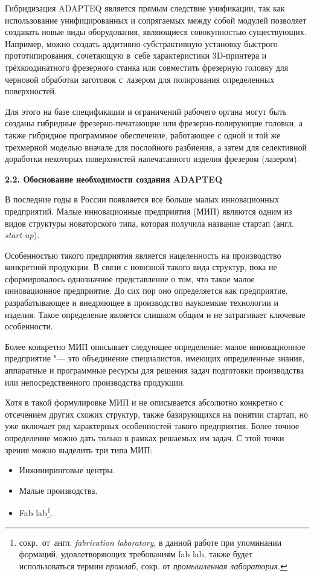 Гибридизация ADAPTEQ является прямым следствие унификации, так как использование унифицированных и сопрягаемых между собой модулей позволяет создавать новые виды оборудования, являющиеся совокупностью существующих. Например, можно создать аддитивно-субстрактивную установку быстрого прототипирования, сочетающую в~себе характеристики 3D-принтера и трёхкоодинатного фрезерного станка или совместить фрезерную головку для черновой обработки заготовок с~лазером для полирования определенных поверхностей.

Для этого на базе спецификации и ограничений рабочего органа могут быть созданы гибридные фрезерно-печатающие или фрезерно-полирующие головки, а также гибридное программное обеспечение, работающее с одной и той же трехмерной моделью вначале для послойного разбиения, а затем для селективной доработки некоторых поверхностей напечатанного изделия фрезером (лазером).

\textbf{2.2. Обоснование необходимости создания ADAPTEQ}

В последние годы в России появляется все больше малых инновационных предприятий. Малые инновационные предприятия (МИП) являются одним из видов структуры новаторского типа, которая получила название стартап (англ. \textit{start-up}).

Особенностью такого предприятия является нацеленность на производство конкретной продукции. В связи с новизной такого вида структур, пока не сформировалось однозначное представление о том, что такое малое инновационное предприятие. До сих пор оно определяется как предприятие, разрабатывающее и внедряющее в производство наукоемкие технологии и изделия. Такое определение является слишком общим и не затрагивает ключевые особенности.

Более конкретно МИП описывает следующее определение: малое инновационное предприятие "--- это объединение специалистов, имеющих определенные знания, аппаратные и программные ресурсы для решения задач подготовки производства или непосредственного производства продукции.

Хотя в такой формулировке МИП и не описывается абсолютно конкретно с отсечением других схожих структур, также базирующихся на понятии стартап, но уже включает ряд характерных особенностей такого предприятия. Более точное определение можно дать только в рамках решаемых им задач. С этой точки зрения можно выделить три типа МИП:

\begin{itemize}
	\item Инжиниринговые центры.
	
	\item Малые производства.
	
	\item Fab lab\footnote{сокр.~от~англ. \textit{fabrication laboratory}, в данной работе при упоминании формаций, удовлетворяющих требованиям fab lab, также будет использоваться термин \textit{промлаб}, сокр. от \textit{промышленная лаборатория}.}.
	\end{itemize}

